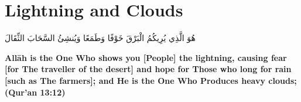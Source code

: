 \chapter{Lightning and Clouds}
\begin{center}
    {\Huge    
        \begin{Arabic}
            هُوَ الَّذِي يُرِيكُمُ الْبَرْقَ خَوْفًا وَطَمَعًا وَيُنشِئُ السَّحَابَ الثِّقَالَ
        \end{Arabic}
    }    
\end{center}
\vspace*{\fill}
\vspace{3cm}
\begin{center}
    \large \textbf{Allāh is the One Who shows you [People] the lightning, causing fear [for The traveller of the desert] and hope for Those who long for rain [such as The farmers]; and He is the One Who Produces heavy clouds; (Qur'an 13:12)}
\end{center}
